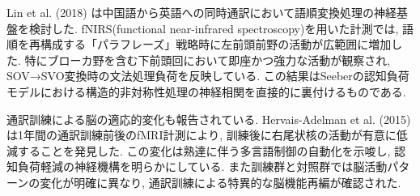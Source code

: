 Lin et al. (2018) \cite{lin2018costly}は中国語から英語への同時通訳において語順変換処理の神経基盤を検討した.
fNIRS(functional near-infrared spectroscopy)を用いた計測では, 語順を再構成する「パラフレーズ」戦略時に左前頭前野の活動が広範囲に増加した.
特にブローカ野を含む下前頭回において即座かつ強力な活動が観察され, SOV→SVO変換時の文法処理負荷を反映している.
この結果はSeeberの認知負荷モデルにおける構造的非対称性処理の神経相関を直接的に裏付けるものである.

通訳訓練による脳の適応的変化も報告されている.
Hervais-Adelman et al. (2015) \cite{hervais2015plasticity}は1年間の通訳訓練前後のfMRI計測により, 訓練後に右尾状核の活動が有意に低減することを発見した.
この変化は熟達に伴う多言語制御の自動化を示唆し, 認知負荷軽減の神経機構を明らかにしている.
また訓練群と対照群では脳活動パターンの変化が明確に異なり, 通訳訓練による特異的な脳機能再編が確認された.